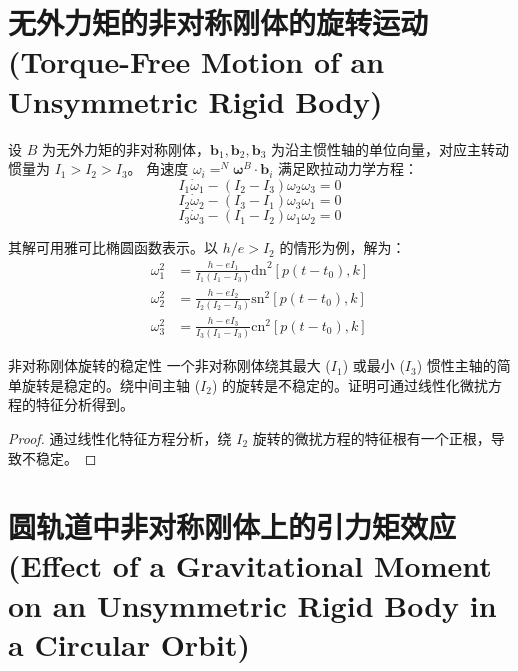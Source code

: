 \section{无外力矩的非对称刚体的旋转运动 (Torque-Free Motion of an Unsymmetric Rigid Body)}

设 \(B\) 为无外力矩的非对称刚体，\(\mathbf{b}_1,\mathbf{b}_2,\mathbf{b}_3\) 为沿主惯性轴的单位向量，对应主转动惯量为 \(I_1>I_2>I_3\)。
角速度 \(\omega_i = ^N\boldsymbol{\omega}^B \cdot \mathbf{b}_i\) 满足欧拉动力学方程：
\begin{equation}
I_1\dot{\omega}_1 - (I_2 - I_3)\omega_2\omega_3 = 0 \tag{39}
\end{equation}
\begin{equation}
I_2\dot{\omega}_2 - (I_3 - I_1)\omega_3\omega_1 = 0 \tag{40}
\end{equation}
\begin{equation}
I_3\dot{\omega}_3 - (I_1 - I_2)\omega_1\omega_2 = 0 \tag{41}
\end{equation}

其解可用雅可比椭圆函数表示。以 \(h/e > I_2\) 的情形为例，解为：
\begin{align}
\omega_1^2 &= \frac{h - eI_1}{I_1(I_1 - I_3)} \text{dn}^2[p(t - t_0), k] \tag{11} \\
\omega_2^2 &= \frac{h - eI_2}{I_2(I_2 - I_3)} \text{sn}^2[p(t - t_0), k] \tag{12} \\
\omega_3^2 &= \frac{h - eI_3}{I_3(I_1 - I_3)} \text{cn}^2[p(t - t_0), k] \tag{13}
\end{align}

\begin{myTheorem}{非对称刚体旋转的稳定性}
一个非对称刚体绕其最大 (\(I_1\)) 或最小 (\(I_3\)) 惯性主轴的简单旋转是稳定的。绕中间主轴 (\(I_2\)) 的旋转是不稳定的。证明可通过线性化微扰方程的特征分析得到。
\end{myTheorem}
\begin{proof}
通过线性化特征方程分析，绕 \(I_2\) 旋转的微扰方程的特征根有一个正根，导致不稳定。
\end{proof}

\section{圆轨道中非对称刚体上的引力矩效应 (Effect of a Gravitational Moment on an Unsymmetric Rigid Body in a Circular Orbit)}

